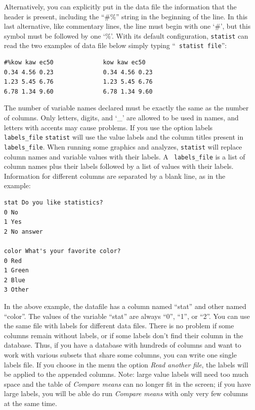 \documentclass[12pt,english]{article}
\newcommand{\st}{{\tt sta\-tist} }
\begin{document}
Alternatively, you can explicitly put in the data file the
information that the header is present, including the
``\#\%'' string in the beginning of the line. In this last
alternative, like commentary lines, the line must begin with
one `\#', but this symbol must be followed by one `\%'.
With its default configuration, \st can read the two
examples of data file below simply typing ``{\tt
statist~file}'':

\begin{verbatim}
#%kow kaw ec50              kow kaw ec50
0.34 4.56 0.23              0.34 4.56 0.23
1.23 5.45 6.76              1.23 5.45 6.76
6.78 1.34 9.60              6.78 1.34 9.60
\end{verbatim}

The number of variable names declared must be exactly the
same as the number of columns. Only letters, digits, and
`\_' are allowed to be used in names, and letters with
accents may cause problems.  If you use the option 
\verb --labels  {\tt labels\_file} \st will use the value
labels and the column titles present in {\tt labels\_file}.
When running some graphics and analyzes, \st will replace
column names and variable values with their labels. A {\tt
labels\_file} is a list of column names plus their labels
followed by a list of values with their labels. Information
for different columns are separated by a blank line, as in
the example:

\begin{verbatim}
stat Do you like statistics?
0 No
1 Yes
2 No answer

color What's your favorite color?
0 Red
1 Green
2 Blue
3 Other
\end{verbatim}

In the above example, the datafile has a column named
``stat'' and other named ``color''. The values of the
variable ``stat'' are always ``0'', ``1'', or ``2''. You can
use the same file with labels for different data files. There
is no problem if some columns remain without labels, or if
some labels don't find their column in the database. Thus,
if you have a database with hundreds of columns and want to
work with various subsets that share some columns, you can
write one single labels file. If you choose in the menu the
option {\em Read another file}, the labels will be applied to
the appended columns. Note: large value labels will need too
much space and the table of {\em Compare means} can no longer
fit in the screen; if you have large labels, you will be
able do run {\em Compare means} with only very few columns at
the same time.
\end{document}
